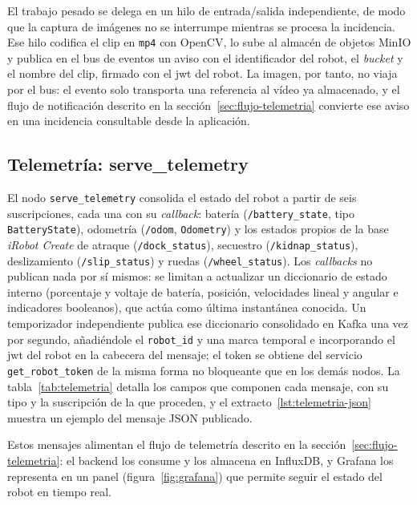El trabajo pesado se delega en un hilo de entrada/salida independiente, de modo que
la captura de imágenes no se interrumpe mientras se procesa la incidencia. Ese hilo
codifica el clip en \texttt{mp4} con OpenCV, lo sube al almacén de objetos MinIO y
publica en el bus de eventos un aviso con el identificador del robot, el
\textit{bucket} y el nombre del clip, firmado con el \gls{jwt} del robot. La imagen,
por tanto, no viaja por el bus: el evento solo transporta una referencia al vídeo ya
almacenado, y el flujo de notificación descrito en la
sección~\ref{sec:flujo-telemetria} convierte ese aviso en una incidencia consultable
desde la aplicación.

\subsection{Telemetría: serve\_telemetry}
\label{sec:serve-telemetry}

El nodo \texttt{serve\_telemetry} consolida el estado del robot a partir de seis
suscripciones, cada una con su \textit{callback}: batería (\texttt{/battery\_state},
tipo \texttt{BatteryState}), odometría (\texttt{/odom}, \texttt{Odometry}) y los
estados propios de la base \textit{iRobot Create} de atraque (\texttt{/dock\_status}),
secuestro (\texttt{/kidnap\_status}), deslizamiento (\texttt{/slip\_status}) y ruedas
(\texttt{/wheel\_status}). Los \textit{callbacks} no publican nada por sí mismos: se
limitan a actualizar un diccionario de estado interno (porcentaje y voltaje de
batería, posición, velocidades lineal y angular e indicadores booleanos), que actúa
como última instantánea conocida. Un temporizador independiente publica ese
diccionario consolidado en Kafka una vez por segundo, añadiéndole el \texttt{robot\_id}
y una marca temporal e incorporando el \gls{jwt} del robot en la cabecera del mensaje;
el token se obtiene del servicio \texttt{get\_robot\_token} de la misma forma no
bloqueante que en los demás nodos. La tabla~\ref{tab:telemetria} detalla los campos que
componen cada mensaje, con su tipo y la suscripción de la que proceden, y el
extracto~\ref{lst:telemetria-json} muestra un ejemplo del mensaje JSON publicado.

Estos mensajes alimentan el flujo de telemetría descrito en la
sección~\ref{sec:flujo-telemetria}: el backend los consume y los almacena en InfluxDB, y
Grafana los representa en un panel (figura~\ref{fig:grafana}) que permite seguir el
estado del robot en tiempo real.

